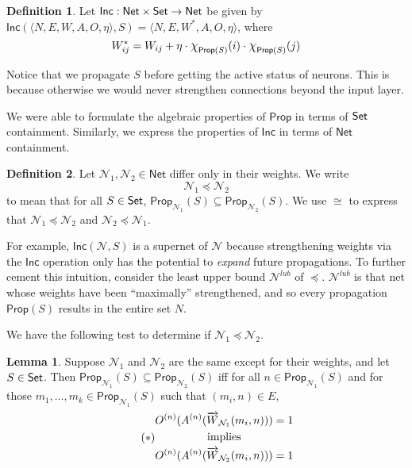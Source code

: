 \documentclass[letterpaper]{article}
\newcommand{\Set}{\mbox{\sf Set}}
\theoremstyle{definition}
\newtheorem{definition}{Definition}
\newtheorem{lemma}[theorem]{Lemma}
\newcommand{\Prop}{\textsf{Prop}}
\newcommand{\Inc}{\textsf{Inc}}
\newcommand{\AllNets}{\mathsf{Net}}
\newcommand{\Net}{\mathcal{N}}
\newcommand*{\bigchi}{\mbox{\Large$\chi$}}%
\begin{document}
\begin{definition}
Let ${\Inc : \AllNets \times \Set \to \AllNets}$ be given by $\Inc(\langle N, E, W, A, O, \eta \rangle, S) = \langle N, E, W^\ast, A, O, \eta \rangle$, where
\[
    W_{ij}^\ast = W_{ij} + \eta \cdot \bigchi_{\Prop(S)}(i) \cdot  \bigchi_{\Prop(S)}(j)
\]
\end{definition}
Notice that we propagate $S$ before getting the active status of neurons.  
This is because otherwise
we would never strengthen connections beyond the input layer.

We were able to formulate the algebraic properties of $\Prop$ in terms of $\Set$ containment.  Similarly, we express the properties of $\Inc$ in terms of $\AllNets$ containment.  

\begin{definition}
Let $\Net_1, \Net_2 \in \AllNets$ differ only in their weights.  We write
\[
    \Net_1 \preceq \Net_2
\]
to mean that for all $S \in \Set$, $\Prop_{\Net_1}(S) \subseteq \Prop_{\Net_2}(S)$.  We use $\cong$ to express that $\Net_1 \preceq \Net_2$ and $\Net_2 \preceq \Net_1$.
\end{definition}

For example, $\Inc(\Net, S)$ is a supernet of $\Net$ because strengthening weights via the $\Inc$ operation only has the potential to \emph{expand} future propagations.  To further cement this intuition, consider the least upper bound $\mathcal{N}^{lub}$ of $\preceq$.  $\mathcal{N}^{lub}$ is that net whose weights have been ``maximally'' strengthened, and so every propagation $\Prop(S)$ results in the entire set $N$.

We have the following test to determine if $\Net_1 \preceq \Net_2$.
\begin{lemma}
\label{lemma:subnet->leq}
Suppose $\Net_1$ and $\Net_2$ are the same except for their weights, and let $S \in \Set$.  Then ${\Prop_{\Net_1}(S) \subseteq \Prop_{\Net_2}(S)}$ iff for all $n \in \Prop_{\Net_1}(S)$ and for those $m_1, \ldots, m_k \in \Prop_{\Net_1}(S)$ such that $(m_i, n) \in E$,
\begin{equation}\tag{$\ast$}
\label{eqn:weight-condition}
  \begin{gathered}
    O^{(n)}(A^{(n)}(\smash{\overrightarrow{W}}_{\Net_1}(m_i, n))) = 1 \\
    \mbox{implies} \\
    O^{(n)}(A^{(n)}(\smash{\overrightarrow{W}}_{\Net_2}(m_i, n))) = 1
  \end{gathered}
\end{equation}
\end{lemma}
\end{document}
